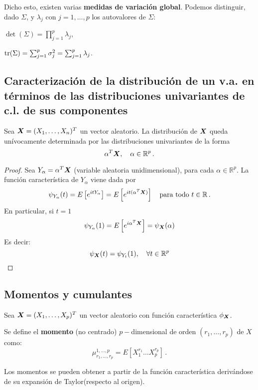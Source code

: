 Dicho esto, existen varias \textbf{medidas de variación global}. Podemos distinguir, dado $\Sigma$, y $\lambda_j$ con $j = 1,\dots,p$ los autovalores de $\Sigma$:
\begin{nlist}
\item $\det(\Sigma) =  \prod_{j=1}^p \lambda_j$,
  \item $\operatorname{tr}(\Sigma) = \sum_{j = 1}^p \sigma_j^2 = \sum_{j=1}^p \lambda_j$.
\end{nlist}

\subsection{Caracterización de la distribución de un v.a. en términos de las distribuciones univariantes de c.l. de sus componentes}

\begin{nth} \label{dist_univ}
  Sea $\boldsymbol{X} = (X_1,\dots, X_n)^T$ un vector aleatorio. La distribución de $\boldsymbol{X}$ queda unívocamente determinada por las distribuciones univariantes de la forma
  \[
\alpha ^T \boldsymbol{X}, \quad \alpha \in \mathbb R ^p\,.
  \]
\end{nth}
\begin{proof}
  Sea $Y_\alpha = \alpha^T \boldsymbol{X}$ (variable aleatoria unidimensional), para cada $\alpha \in \mathbb R^p$. La función característica de $Y_\alpha$ viene dada por
  \[
  \psi_{Y_\alpha}(t) = E\left[e^{itY_\alpha}\right] = E \left[e^{it(\alpha^T \boldsymbol{X})}\right] \quad \text{para todo } t \in \mathbb R\,.
  \]
  En particular, si $t=1$
  \[
  \psi_{Y_\alpha}(1) = E\left[e^{i\alpha^T \boldsymbol{X}}\right] = \psi_{\boldsymbol{X}} (\alpha)
  \]
  Es decir:
  \[
  \psi_{\boldsymbol{X}}(t) = \psi_{Y_t}(1), \quad \forall t \in \mathbb R ^p
  \]
\end{proof}

\subsection{Momentos y cumulantes}

Sea $\boldsymbol{X}= (X_1,\dots,X_p)^T$ un vector aleatorio con función característica $\phi_{\boldsymbol{X}}$.
\begin{ndef}
  Se define el \textbf{momento} (no centrado) $p-$dimensional de orden $(r_1, \dots, r_p)$ de $X$ como:
  \[
\mu_{r_1,\dots,r_p}^{1,\dots,p} = E \left[ X_1^{r_1} \dots X_p^{r_p}\right]\,.
  \]
\end{ndef}

Los momentos se pueden obtener a partir de la función característica derivándose de su expansión de Taylor(respecto al origen).

